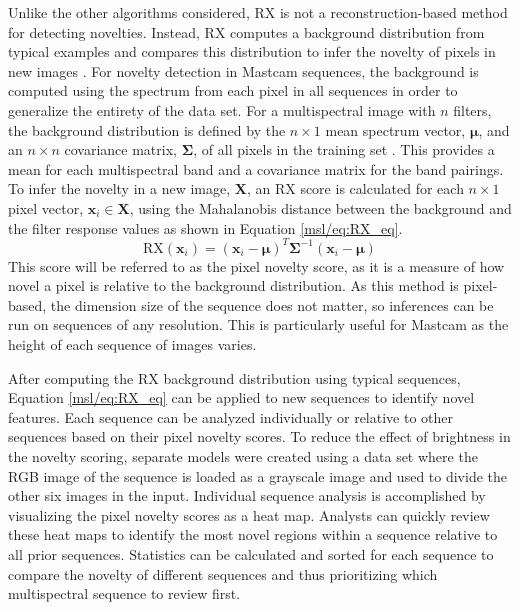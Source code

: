Unlike the other algorithms considered, RX is not a reconstruction-based method for detecting novelties.
Instead, RX computes a background distribution from typical examples and compares this distribution to infer the novelty of pixels in new images \parencite{reed1990adaptive}.
For novelty detection in Mastcam sequences, the background is computed using the spectrum from each pixel in all sequences in order to generalize the entirety of the data set. 
For a multispectral image with $n$ filters, the background distribution is defined by the $n \times 1$ mean spectrum vector, $\boldsymbol{\mu}$, and an $n \times n$ covariance matrix, $\boldsymbol{\Sigma}$, of all pixels in the training set \parencite{guo2016anomaly}.
This provides a mean for each multispectral band and a covariance matrix for the band pairings. 
To infer the novelty in a new image, $\boldsymbol{X}$, an RX score is calculated for each $n \times 1$ pixel vector, $\boldsymbol{x}_i \in \boldsymbol{X}$, using the Mahalanobis distance between the background and the filter response values as shown in Equation \ref{msl/eq:RX_eq}.
\begin{equation}
    \label{msl/eq:RX_eq}
    \text{RX}(\boldsymbol{x}_i) = (\boldsymbol{x}_i - \boldsymbol{\mu})^T \boldsymbol{\Sigma}^{-1} (\boldsymbol{x}_i - \boldsymbol{\mu})
\end{equation}
This score will be referred to as the pixel novelty score, as it is a measure of how novel a pixel is relative to the background distribution. 
As this method is pixel-based, the dimension size of the sequence does not matter, so inferences can be run on sequences of any resolution.
This is particularly useful for Mastcam as the height of each sequence of images varies. 

After computing the RX background distribution using typical sequences, Equation \ref{msl/eq:RX_eq} can be applied to new sequences to identify novel features.
Each sequence can be analyzed individually or relative to other sequences based on their pixel novelty scores. 
To reduce the effect of brightness in the novelty scoring, separate models were created using a data set where the RGB image of the sequence is loaded as a grayscale image and used to divide the other six images in the input. 
Individual sequence analysis is accomplished by visualizing the pixel novelty scores as a heat map. 
Analysts can quickly review these heat maps to identify the most novel regions within a sequence relative to all prior sequences. 
Statistics can be calculated and sorted for each sequence to compare the novelty of different sequences and thus prioritizing which multispectral sequence to review first. 

